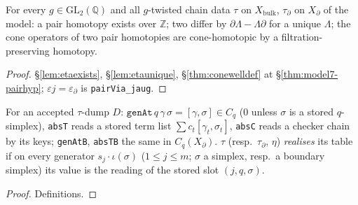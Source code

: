 \begin{corollary}\label{cor:model7-etaexists}
  \leanok
  For every $g\in\mathrm{GL}_2(\mathbb Q)$ and all $g$-twisted chain data $\tau$ on $X_{\mathrm{bulk}}$, $\tau_\partial$ on $X_\partial$ of
  the model: a pair homotopy exists over $\mathbb Z$; two differ by $\partial\Lambda-\Lambda\partial$ for a unique $\Lambda$; the cone
  operators of two pair homotopies are cone-homotopic by a filtration-preserving homotopy.
\end{corollary}
\begin{proof}
  \leanok
  \S\ref{lem:etaexists}, \S\ref{lem:etaunique}, \S\ref{thm:conewelldef} at \S\ref{thm:model7-pairhyp}; $\varepsilon j=\varepsilon_\partial$ is
  \texttt{pairVia\_jaug}.
\end{proof}

\begin{definition}\label{def:etaread}
  \leanok
  For an accepted $\tau$-dump $D$: $\texttt{genAt}\,q\,\gamma\,\sigma=[\gamma,\sigma]\in C_q$ ($0$ unless $\sigma$ is a stored $q$-simplex),
  \texttt{absT} reads a stored term list $\sum c_t[\gamma_t,\sigma_t]$, \texttt{absC} reads a checker chain by its keys; \texttt{genAtB},
  \texttt{absTB} the same in $C_q(X_\partial)$. $\tau$ (resp.\ $\tau_\partial$, $\eta$) \emph{realises} its table if on every generator
  $s_j\cdot\iota(\sigma)$ ($1\le j\le m$; $\sigma$ a simplex, resp.\ a boundary simplex) its value is the reading of the stored slot
  $(j,q,\sigma)$.
\end{definition}
\begin{proof}
  \leanok
  Definitions.
\end{proof}

